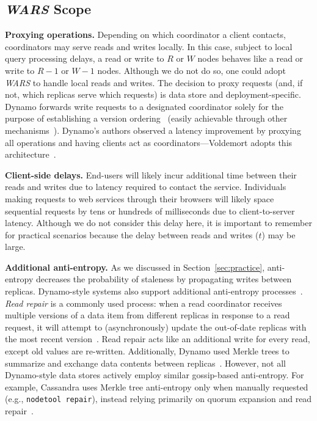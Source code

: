 \documentclass{vldb}
\newcommand{\subsectionskip}{-0em}
\begin{document}
\vspace{\subsectionskip}\subsection{{\large \textit{WARS}} Scope}
\label{sec:anti-entropy}

\textbf{Proxying operations.} Depending on which coordinator a client
contacts, coordinators may serve reads and writes locally.  In this
case, subject to local query processing delays, a read or write to $R$
or $W$ nodes behaves like a read or write to $R-1$ or $W-1$ nodes.
Although we do not do so, one could adopt \textit{WARS} to handle local
reads and writes.  The decision to proxy requests (and, if not, which
replicas serve which requests) is data store and deployment-specific.
Dynamo forwards write requests to a designated coordinator solely for
the purpose of establishing a version ordering~\cite[Section
  6.4]{dynamo} (easily achievable through other
mechanisms~\cite{zookeeper}).  Dynamo's authors observed a latency
improvement by proxying all operations and having clients act as
coordinators---Voldemort adopts this
architecture~\cite{voldemortclient}.

\textbf{Client-side delays.} End-users will likely incur additional time
between their reads and writes due to latency required to
contact the service.  Individuals making requests to web services
through their browsers will likely space sequential requests by tens
or hundreds of milliseconds due to client-to-server latency.  Although
we do not consider this delay here, it is important to remember for
practical scenarios because the delay between reads and writes ($t$)
may be large.

\textbf{Additional anti-entropy.} As we discussed in
Section~\ref{sec:practice}, anti-entropy decreases the probability of
staleness by propagating writes between replicas.  Dynamo-style
systems also support additional anti-entropy processes~\cite{nosql}.
\textit{Read repair} is a commonly used process: when a read coordinator
receives multiple versions of a data item from different replicas in
response to a read request, it will attempt to (asynchronously) update
the out-of-date replicas with the most recent version~\cite[Section
  5]{dynamo}.  Read repair acts like an additional write for every
read, except old values are re-written.  Additionally, Dynamo used
Merkle trees to summarize and exchange data contents between
replicas~\cite[Section 4.7]{dynamo}.  However, not all Dynamo-style
data stores actively employ similar gossip-based anti-entropy.  For
example, Cassandra uses Merkle tree anti-entropy only when manually
requested (e.g., \texttt{nodetool repair}), instead relying primarily
on quorum expansion and read repair~\cite{cassandra-merkle}.
\end{document}
